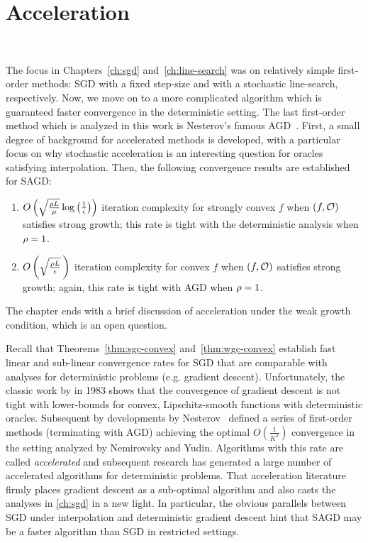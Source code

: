 
\chapter{Acceleration}~\label{ch:acceleration}

The focus in Chapters~\ref{ch:sgd} and~\ref{ch:line-search} was on relatively simple first-order methods: \ac{SGD} with a fixed step-size and with a stochastic line-search, respectively.
Now, we move on to a more complicated algorithm which is guaranteed faster convergence in the deterministic setting.
The last first-order method which is analyzed in this work is Nesterov's famous \ac{AGD}~\cite{nesterov2004lectures}.
First, a small degree of background for accelerated methods is developed, with a particular focus on why stochastic acceleration is an interesting question for oracles satisfying interpolation.
Then, the following convergence results are established for \ac{SAGD}:
\begin{enumerate}
    \item \( O\rbr{\sqrt{\frac{\sgc L}{\mu}} \log \rbr{\inv{\epsilon}}} \) iteration complexity for strongly convex \( f \) when \( \rbr{f, \oracle{}} \) satisfies strong growth; this rate is tight with the deterministic analysis when \( \sgc = 1 \).
    \item \( O\rbr{\sqrt{\frac{\sgc L}{\epsilon}} \,} \) iteration complexity for convex \( f \) when \( \rbr{f, \oracle{}} \) satisfies strong growth; again, this rate is tight with \ac{AGD} when \( \sgc = 1 \).
\end{enumerate}
The chapter ends with a brief discussion of acceleration under the weak growth condition, which is an open question.

Recall that Theorems~\ref{thm:sgc-convex} and~\ref{thm:wgc-convex} establish fast linear and sub-linear convergence rates for \ac{SGD} that are comparable with analyses for deterministic problems (e.g. gradient descent).
Unfortunately, the classic work by \citet{nemirovsky1983problem} in 1983 shows that the convergence of gradient descent is not tight with lower-bounds for convex, Lipschitz-smooth functions with deterministic oracles. 
Subsequent by developments by Nesterov~\citep{nesterov1983method, nemirovsky1985optimal, nesterov1988approach} defined a series of first-order methods (terminating with \ac{AGD}) achieving the optimal \( O(\frac{1}{K^2}) \) convergence in the setting analyzed by Nemirovsky and Yudin. 
Algorithms with this rate are called \emph{accelerated} and subsequent research has generated a large number of accelerated algorithms for deterministic problems.
That acceleration literature firmly places gradient descent as a sub-optimal algorithm and also casts the analyses in \autoref{ch:sgd} in a new light.
In particular, the obvious parallels between \ac{SGD} under interpolation and deterministic gradient descent hint that \ac{SAGD} may be a faster algorithm than \ac{SGD} in restricted settings. 

